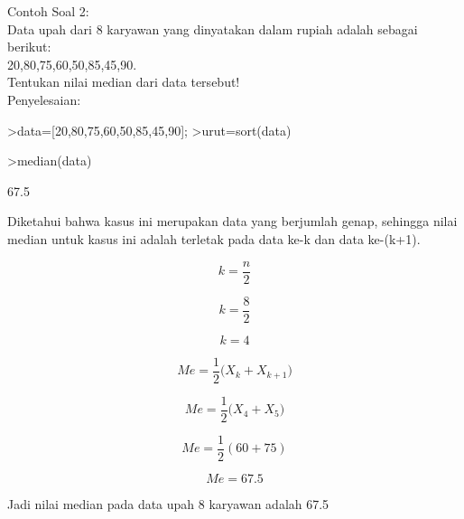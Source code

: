 \documentclass[a4paper,10pt]{article}
\begin{document}
\begin{eulernotebook}
\begin{eulercomment}
Contoh Soal 2:\\
Data upah dari 8 karyawan yang dinyatakan dalam rupiah adalah sebagai
berikut:\\
20,80,75,60,50,85,45,90.\\
Tentukan nilai median dari data tersebut!\\
Penyelesaian:
\end{eulercomment}
\begin{eulerprompt}
>data=[20,80,75,60,50,85,45,90];
>urut=sort(data)
\end{eulerprompt}
\begin{euleroutput}
  [20,  45,  50,  60,  75,  80,  85,  90]
\end{euleroutput}
\begin{eulerprompt}
>median(data)
\end{eulerprompt}
\begin{euleroutput}
  67.5
\end{euleroutput}
\begin{eulercomment}
Diketahui bahwa kasus ini merupakan data yang berjumlah genap,
sehingga nilai median untuk kasus ini adalah terletak pada data ke-k
dan data ke-(k+1).\\
\end{eulercomment}
\begin{eulerformula}
\[
k = \frac{n}{2}
\]
\end{eulerformula}
\begin{eulerformula}
\[
k = \frac{8}{2}
\]
\end{eulerformula}
\begin{eulerformula}
\[
k = 4
\]
\end{eulerformula}
\begin{eulercomment}
\end{eulercomment}
\begin{eulerformula}
\[
Me = \frac{1}{2}({X_k+X_{k+1})}
\]
\end{eulerformula}
\begin{eulerformula}
\[
Me = \frac{1}{2}({X_4+X_{5})}
\]
\end{eulerformula}
\begin{eulerformula}
\[
Me = \frac{1}{2}({60+75})
\]
\end{eulerformula}
\begin{eulerformula}
\[
Me = 67.5
\]
\end{eulerformula}
\begin{eulercomment}
Jadi nilai median pada data upah 8 karyawan adalah 67.5
\end{eulercomment}
\begin{eulercomment}


\end{eulercomment}
\end{eulernotebook}
\end{document}
